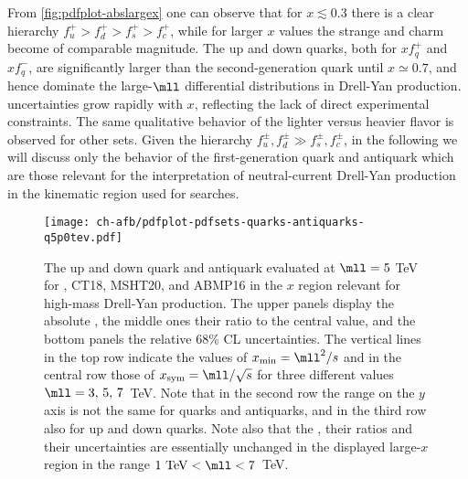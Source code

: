    From \cref{fig:pdfplot-abslargex} one can observe that for
   $x\lesssim 0.3$ there is a clear hierarchy
$f_u^+>f_d^+ >f_s^+>f_c^+$, while for larger $x$ values the
   strange and charm \pdfs become of comparable magnitude.
   The up and down quarks, both for $xf^+_q$ and $xf^-_q$, are significantly larger
   than the second-generation quark \pdfs until $x\simeq 0.7$, and hence dominate the
   large-$\mll$ differential distributions in Drell-Yan production.
%
\pdf uncertainties grow rapidly with $x$, reflecting the lack
of direct experimental constraints.
%
The same qualitative behavior of the lighter versus heavier flavor \pdfs
is observed for other \pdf sets.
%
Given the hierarchy $f_u^\pm, f_d^\pm \gg f_s^\pm, f_c^\pm $, in the following
we will discuss only the behavior of the first-generation quark
and antiquark \pdfs which are those relevant for the interpretation
of neutral-current Drell-Yan production in the kinematic region used
for \bsm searches. 
      


\begin{figure}[!t]
 \centering
 \texttt{[image: ch-afb/pdfplot-pdfsets-quarks-antiquarks-q5p0tev.pdf]}
 \caption{\small The up and down quark and antiquark \pdfs evaluated at $\mll=5$ TeV
   for , CT18, MSHT20, and ABMP16 in the $x$ region relevant for
   high-mass Drell-Yan production. The upper panels display the absolute \pdfs,
   the middle ones their ratio to the central  value, and the bottom panels
   the relative 68\% CL uncertainties.
   The vertical lines in the top
   row indicate the values of  $x_{\rm min}=\mll^2/s$ and in the central
   row those of $x_{\rm  sym}=\mll/\sqrt{s}$
   for three
   different values  $\mll=3,\,5,\,7$~TeV.
   Note that in the second row the
   range on the $y$ axis is not the same for quarks and antiquarks,
   and in the third row also for up and down quarks.
   Note also that the
   \pdfs, their ratios and their uncertainties are essentially
   unchanged in the displayed large-$x$ region in the range $1~{\rm TeV}<\mll<7$~TeV.
}    
 \label{fig:mll_dep_pdfs}
\end{figure}

